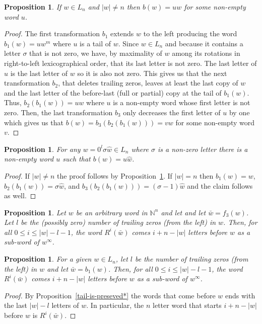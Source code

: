 \documentclass{article}
\newtheorem{proposition}[theorem]{Proposition}
\theoremstyle{definition}
\newcommand{\N}{{\mathbb{N}}}
\newcommand{\rr}[2]{R^{#2}({#1})}
\begin{document}
\begin{proposition}
	\label{w-at-the-tail}
	If $w \in L_n$ and $|w| \neq n$ then  $b(w)=uw$ for some non-empty word $u$. 
\end{proposition}
\begin{proof}
	The first transformation $b_1$ extends $w$ to the left producing the word $b_1(w)=uw^m$ where $u$ is a tail of $w$. Since $w \in L_n$ and because it contains a letter $\sigma$ that is not zero, we have, by maximality of $w$ among its rotations in right-to-left lexicographical order,  that its last letter is not zero. The last letter of $u$ is the last letter of $w$ so it is also not zero. This gives us that the next transformation $b_2$, that deletes trailing zeros, leaves at least the last copy of $w$ and the last letter of the before-last (full or partial) copy at the tail of $b_1(w)$. Thus, $b_2(b_1(w))=uw$ where $u$ is a non-empty word whose first letter is not zero. Then, the last transformation $b_3$ only decreases the first letter of $u$ by  one which gives us that $b(w)=b_3(b_2(b_1(w)))=vw$ for some non-empty word $v$.	
\end{proof}
	
\begin{proposition}
	\label{hat-w-at-the-tail}
	For any $w=0^l \sigma \hat{w}\in L_n$ where $\sigma$ is a non-zero letter there is a non-empty word $u$ such that $b(w)=u\hat{w}$.
\end{proposition}
\begin{proof}
	If $|w|\neq n$ the proof follows by Proposition~\ref{w-at-the-tail}. If $|w|=n$ then $b_1(w)=w$, $b_2(b_1(w))=\sigma\hat{w}$, and $b_3(b_2(b_1(w)))=(\sigma-1)\hat{w}$ and the claim follows as well.
\end{proof}
	
	
\begin{proposition}\label{simple-pos}
	Let $w$ be an arbitrary word in $\N^n$ and let and let $\bar{w}=f_3(w)$. Let $l$ be the (possibly zero) number of trailing zeros (from the left) in $w$.  Then, for all $0 \leq i \leq |w|-l-1$, the word $\rr{\bar{w}}{i}$ comes $i+n-|w|$ letters before $w$ as a sub-word of $w^\infty$.
\end{proposition}



\begin{proposition}\label{simple-pos}
	For a given $w \in L_n$, let $l$ be the number of trailing zeros (from the left) in $w$ and let $\bar{w}=b_1(w)$. Then, for all $0 \leq i \leq |w|-l-1$, the word $\rr{\bar{w}}{i}$ comes $i+n-|w|$ letters before $w$ as a sub-word of $w^\infty$.
\end{proposition}
\begin{proof}
	By Proposition~\ref{tail-is-preseved*} the words that come before $w$ ends with the last $|w|-l$ letters of $w$. In particular, the $n$ letter word that starts $i+n-|w|$ before $w$ is $\rr{\bar{w}}{i}$.
\end{proof}
\end{document}
